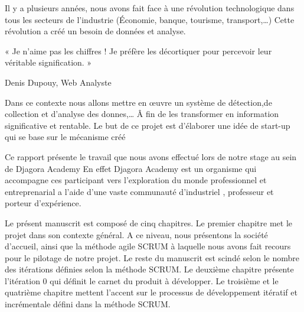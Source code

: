 





 Il y a plusieurs années, nous avons fait face à une révolution technologique
 dans tous les secteurs de l'industrie (Économie, banque, tourisme, transport,\ldots)
Cette révolution a créé un besoin de données et analyse.


 « Je n’aime pas les chiffres ! Je préfère les décortiquer pour percevoir leur véritable signification. »

Denis Dupouy, Web Analyste







Dans ce contexte nous allons mettre en œuvre
un système de
détection,de collection et d'analyse des donnes,\ldots
Â fin de les transformer en information significative et rentable.
Le but de ce projet est d'élaborer une idée de start-up qui se base sur le mécanisme créé

Ce rapport présente le travail que nous avons effectué lors de notre stage au sein de
Djagora Academy
En effet Djagora Academy est un organisme qui accompagne ces participant vers
l'exploration du monde professionnel et entreprenarial a l'aide d'une vaste communauté
d'industriel , professeur et porteur d'expérience.


Le présent manuscrit est composé de cinq chapitres. Le premier chapitre met le
projet dans son contexte général. A ce niveau, nous présentons la société d’accueil,
ainsi que la méthode agile SCRUM à laquelle nous
avons fait recours pour le pilotage de notre projet.
Le reste du manuscrit est scindé selon
le nombre des itérations définies selon la méthode SCRUM. Le deuxième chapitre
présente l’itération 0 qui définit le carnet du produit à développer. Le troisième et le
quatrième chapitre mettent l’accent sur le processus de développement itératif et
incrémentale défini dans la méthode SCRUM.

